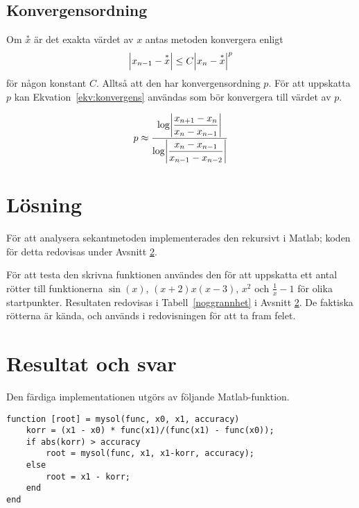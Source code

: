 \documentclass[12pt]{article}
\DeclarePairedDelimiter\abs{\lvert}{\rvert}
\begin{document}
\subsection{Konvergensordning}
Om $\overset{*}{x}$ är det exakta värdet av $x$ antas metoden konvergera enligt 
\[
  \abs*{x_{n-1}-\overset{*}{x}}\leq C\abs*{x_n-\overset{*}{x}}^p
\]
för någon konstant $C$. Alltså att den har konvergensordning $p$. För att uppskatta $p$ kan Ekvation~\ref{ekv:konvergens} användas som bör konvergera till värdet av $p$.

\begin{equation}
  p\approx\dfrac{\log\abs*{\dfrac{x_{n+1}-x_n}{x_n-x_{n-1}}}}{\log\abs*{\dfrac{x_n-x_{n-1}}{x_{n-1}-x_{n-2}}}}
\label{ekv:konvergens}
\end{equation}

\section{Lösning}
För att analysera sekantmetoden implementerades den rekursivt i Matlab; koden för detta redovisas under Avsnitt \ref{resultat}. 

För att testa den skrivna funktionen användes den för att uppskatta ett antal rötter till funktionerna $\sin(x)$, $ (x+2) x (x-3)$, $x^2$ och $\frac{1}{x} - 1$ för olika startpunkter. Resultaten redovisas i Tabell~\ref{noggrannhet} i Avsnitt \ref{resultat}. De faktiska rötterna är kända, och används i redovisningen för att ta fram felet. 

\section{Resultat och svar} \label{resultat}
Den färdiga implementationen utgörs av följande Matlab-funktion.
\begin{lstlisting}
function [root] = mysol(func, x0, x1, accuracy)
    korr = (x1 - x0) * func(x1)/(func(x1) - func(x0));
    if abs(korr) > accuracy
        root = mysol(func, x1, x1-korr, accuracy);
    else
        root = x1 - korr;
    end
end
\end{lstlisting}
\end{document}
